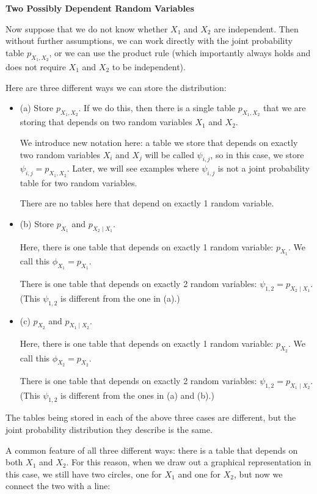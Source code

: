 \documentclass[6008notes.tex]{subfiles}
\begin{document}
\textbf{Two Possibly Dependent Random Variables}

Now suppose that we do not know whether $X_1$ and $X_2$ are independent. Then without further assumptions, we can work directly with the joint probability table $p_{X_1, X_2}$, or we can use the product rule (which importantly always holds and does not require $X_1$ and $X_2$ to be independent).

Here are three different ways we can store the distribution:

\begin{itemize}
\item (a) Store $p_{X_1, X_2}$. If we do this, then there is a single table $p_{X_1, X_2}$ that we are storing that depends on two random variables $X_1$ and $X_2$.

We introduce new notation here: a table we store that depends on exactly two random variables $X_i$ and $X_j$ will be called $\psi_{i, j}$, so in this case, we store $\psi_{i, j} = p_{X_1, X_2}$. Later, we will see examples where $\psi_{i, j}$ is not a joint probability table for two random variables.

There are no tables here that depend on exactly 1 random variable.

\item (b) Store $p_{X_1}$ and $p_{X_2 \mid X_1}$.

Here, there is one table that depends on exactly 1 random variable: $p_{X_1}$. We call this $\phi _{X_1} = p_{X_1}$.

There is one table that depends on exactly 2 random variables: $\psi _{1, 2} = p_{X_2 \mid X_1}$. (This $\psi _{1, 2}$ is different from the one in (a).)

\item (c) $p_{X_2}$ and $p_{X_1 \mid X_2}$.

Here, there is one table that depends on exactly 1 random variable: $p_{X_2}$. We call this $\phi _{X_2} = p_{X_2}$.

There is one table that depends on exactly 2 random variables: $\psi _{1, 2} = p_{X_1 \mid X_2}$. (This $\psi _{1, 2}$ is different from the ones in (a) and (b).)
\end{itemize}

The tables being stored in each of the above three cases are different, but the joint probability distribution they describe is the same.

A common feature of all three different ways: there is a table that depends on both $X_1$ and $X_2$. For this reason, when we draw out a graphical representation in this case, we still have two circles, one for $X_1$ and one for $X_2$, but now we connect the two with a line:
\end{document}
